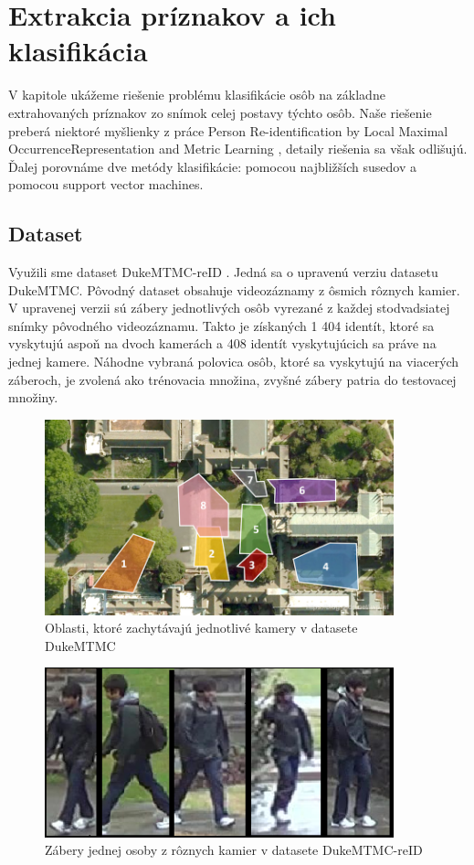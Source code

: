 \chapter{Extrakcia príznakov a ich klasifikácia}
\label{kap:features}
V kapitole ukážeme riešenie problému klasifikácie osôb na základne extrahovaných príznakov zo snímok celej postavy týchto osôb.
Naše riešenie preberá niektoré myšlienky z práce Person Re-identification by Local Maximal OccurrenceRepresentation and Metric Learning \cite{featuresinspiration}, detaily riešenia sa však odlišujú.
Ďalej porovnáme dve metódy klasifikácie: pomocou najbližších susedov a pomocou support vector machines.
\section{Dataset}
Využili sme dataset DukeMTMC-reID \cite{ristani2016MTMC} \cite{zheng2017unlabeled}. 
Jedná sa o upravenú verziu datasetu DukeMTMC.
Pôvodný dataset obsahuje videozáznamy z ôsmich rôznych kamier.
V upravenej verzii sú zábery jednotlivých osôb vyrezané z každej stodvadsiatej snímky pôvodného videozáznamu.
Takto je získaných 1 404 identít, ktoré sa vyskytujú aspoň na dvoch kamerách a 408 identít vyskytujúcich sa práve na jednej kamere.
Náhodne vybraná polovica osôb, ktoré sa vyskytujú na viacerých záberoch, je zvolená ako trénovacia množina, zvyšné zábery patria do testovacej množiny.

\begin{figure}[H]
\centerline{\includegraphics[width=0.9\textwidth]{images/duke_topology}}
\caption[Topológia kamier]{Oblasti, ktoré zachytávajú jednotlivé kamery v datasete DukeMTMC}
\label{obr:duke_topology}
\end{figure}

\begin{figure}[H]
\centerline{\includegraphics[width=0.9\textwidth]{images/duke_same}}
\caption[Ukážka datasetu]{Zábery jednej osoby z rôznych kamier v datasete DukeMTMC-reID}
\label{obr:duke_same}
\end{figure}

